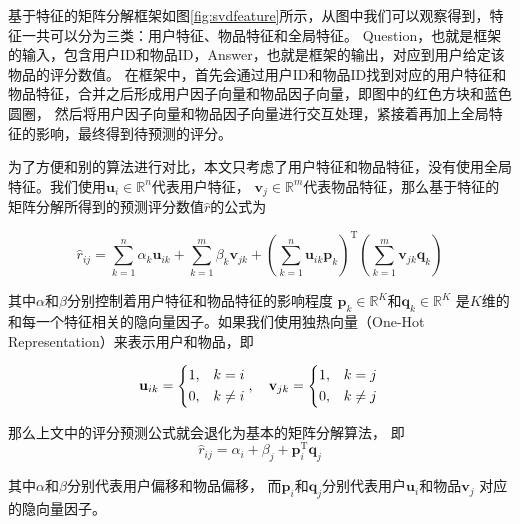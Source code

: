基于特征的矩阵分解框架如图\ref{fig:svdfeature}所示，从图中我们可以观察得到，特征一共可以分为三类：用户特征、物品特征和全局特征。
Question，也就是框架的输入，包含用户ID和物品ID，Answer，也就是框架的输出，对应到用户给定该物品的评分数值。
在框架中，首先会通过用户ID和物品ID找到对应的用户特征和物品特征，合并之后形成用户因子向量和物品因子向量，即图中的红色方块和蓝色圆圈，
然后将用户因子向量和物品因子向量进行交互处理，紧接着再加上全局特征的影响，最终得到待预测的评分。

为了方便和别的算法进行对比，本文只考虑了用户特征和物品特征，没有使用全局特征。我们使用$\mathbf{u}_i \in \mathbb{R}^{n}$代表用户特征，
$\mathbf{v}_j \in \mathbb{R}^{m}$代表物品特征，那么基于特征的矩阵分解所得到的预测评分数值$\hat{r}$的公式为

\begin{equation}
\hat{r}_{ij} = \sum_{k=1}^{n} \alpha_k \mathbf{u}_{ik} + \sum_{k=1}^{m} \beta_k \mathbf{v}_{jk} +
\left( \sum_{k=1}^{n} \mathbf{u}_{ik} \mathbf{p}_k \right) ^ \mathrm{T}
\left( \sum_{k=1}^{m} \mathbf{v}_{jk} \mathbf{q}_k \right)
\end{equation}

其中$\alpha$和$\beta$分别控制着用户特征和物品特征的影响程度
$\mathbf{p}_{k} \in \mathbb{R}^K$和$\mathbf{q}_{k} \in \mathbb{R}^K$
是$K$维的和每一个特征相关的隐向量因子。如果我们使用独热向量（One-Hot Representation）来表示用户和物品，即

\begin{equation}
\mathbf{u}_{ik} =
\left\{
\begin{aligned}
1, &\quad k = i \\
0, &\quad k \not= i
\end{aligned}
\right. \\ , \quad
\mathbf{v}_{jk} =
\left\{
\begin{aligned}
1, &\quad k = j \\
0, &\quad k \not= j
\end{aligned}
\right. \\
\end{equation}

那么上文中的评分预测公式就会退化为基本的矩阵分解算法，
即
\begin{equation}
\hat{r}_{ij} = \alpha_i + \beta_j + \mathbf{p}_i ^ \mathrm{T} \mathbf{q}_j
\end{equation}

其中$\alpha$和$\beta$分别代表用户偏移和物品偏移，
而$\mathbf{p}_i$和$\mathbf{q}_j$分别代表用户$\mathbf{u}_i$和物品$\mathbf{v}_j$
对应的隐向量因子。

